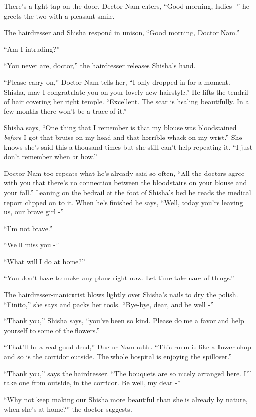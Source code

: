 \documentclass[twoside,11pt]{book}
\begin{document}
There's a light tap on the door. Doctor Nam enters, ``Good morning, ladies -'' he greets the
two with a pleasant smile.

The hairdresser and Shisha respond in unison, ``Good morning, Doctor Nam.''

``Am I intruding?''

``You never are, doctor,'' the hairdresser releases Shisha's hand.

``Please carry on,'' Doctor Nam tells her, ``I only dropped in for a moment.
Shisha, may I congratulate you on your lovely new hairstyle.'' He lifts the tendril of hair covering her
right temple. ``Excellent. The scar is healing beautifully.  In a few months there won't be a trace of
it.''

Shisha says, ``One thing that I remember is that my blouse was bloodstained \textit{before} I got that
bruise on my head and that horrible whack on my wrist.'' She knows she's said this a thousand times but
she still can't help repeating it. ``I just don't remember when or how.''

Doctor Nam too repeats what he's already said so often, ``All the doctors agree with you that there's no
connection between the bloodstains on your blouse and your fall.'' Leaning on the bedrail at the foot of
Shisha's bed he reads the medical report clipped on to it. When he's finished he says, ``Well, today
you're leaving us, our brave girl -''

``I'm not brave.''

``We'll miss you -''

``What will I do at home?''

``You don't have to make any plans right now. Let time take care of things.''

The hairdresser-manicurist blows lightly over Shisha's nails to dry the polish. ``Finito,''
she says and packs her tools.  ``Bye-bye, dear, and be well -''

``Thank you,'' Shisha says, ``you've been so kind. Please do me a favor and help
yourself to some of the flowers.''

``That'll be a real good deed,'' Doctor Nam adds. ``This room is like a flower
shop and so is the corridor outside. The whole hospital is enjoying the spillover.''

``Thank you,'' says the hairdresser. ``The bouquets are so nicely arranged here.
I'll take one from outside, in the corridor. Be well, my dear -''

``Why not keep making our Shisha more beautiful than she is already by nature, when she's at
home?'' the doctor suggests.
\end{document}

